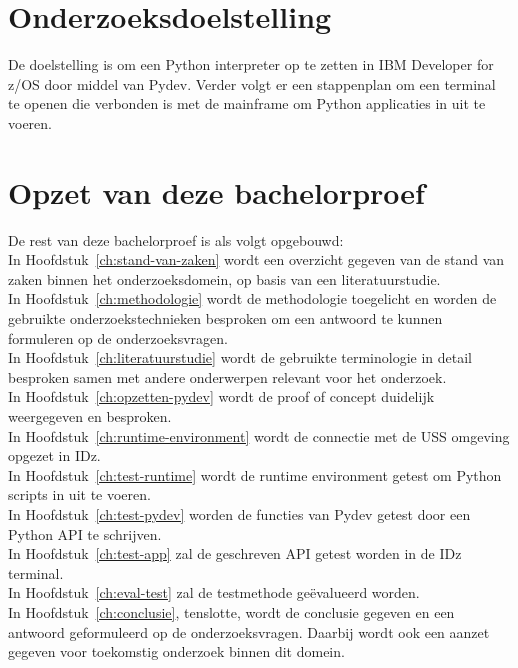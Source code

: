 \section{Onderzoeksdoelstelling}%
\label{sec:onderzoeksdoelstelling}
De doelstelling is om een Python interpreter op te zetten in IBM Developer for z/OS door middel van Pydev. Verder volgt er een stappenplan om een terminal te openen die verbonden is met de mainframe om Python applicaties in uit te voeren.

\section{Opzet van deze bachelorproef}%
\label{sec:opzet-bachelorproef}


De rest van deze bachelorproef is als volgt opgebouwd: \\

In Hoofdstuk~\ref{ch:stand-van-zaken} wordt een overzicht gegeven van de stand van zaken binnen het onderzoeksdomein, op basis van een literatuurstudie. \\

In Hoofdstuk~\ref{ch:methodologie} wordt de methodologie toegelicht en worden de gebruikte onderzoekstechnieken besproken om een antwoord te kunnen formuleren op de onderzoeksvragen. \\

In Hoofdstuk~\ref{ch:literatuurstudie} wordt de gebruikte terminologie in detail besproken samen met andere onderwerpen relevant voor het onderzoek. \\

In Hoofdstuk~\ref{ch:opzetten-pydev} wordt de proof of concept duidelijk weergegeven en besproken. \\

In Hoofdstuk~\ref{ch:runtime-environment} wordt de connectie met de USS omgeving opgezet in IDz. \\

In Hoofdstuk~\ref{ch:test-runtime} wordt de runtime environment getest om Python scripts in uit te voeren. \\

In Hoofdstuk~\ref{ch:test-pydev} worden de functies van Pydev getest door een Python API te schrijven. \\

In Hoofdstuk~\ref{ch:test-app} zal de geschreven API getest worden in de IDz terminal. \\

In Hoofdstuk~\ref{ch:eval-test} zal de testmethode geëvalueerd worden. \\

In Hoofdstuk~\ref{ch:conclusie}, tenslotte, wordt de conclusie gegeven en een antwoord geformuleerd op de onderzoeksvragen. Daarbij wordt ook een aanzet gegeven voor toekomstig onderzoek binnen dit domein.